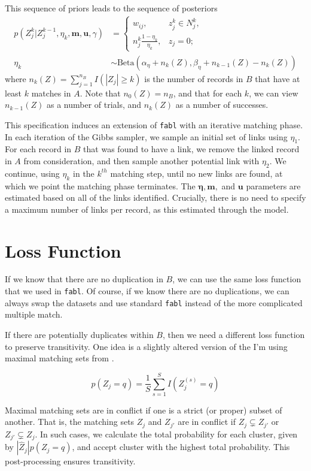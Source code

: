 \documentclass[12pt,letterpaper]{article}
\newcommand{\1}[1]{\mathbb{I}\!\left[#1\right]} %
\begin{document}
This sequence of priors leads to the sequence of posteriors
\begin{align}
	p(Z_j^k|Z_j^{k-1}, \eta_k, \bm{m}, \bm{u}, \gamma) &= \begin{cases}
		w_{ij}, & z_j^k \in N_j^k, \\
		n_j^k \frac{1 - \eta_k}{\eta_k}, & z_j = 0;
	\end{cases} \\
	\eta_k &\sim \text{Beta}(\alpha_{\eta} + n_k(Z), \beta_{\eta} + n_{k-1}(Z) - n_k(Z))
\end{align}
where $n_k(Z) = \sum_{j=1}^{n_B} I( |Z_j| \geq k)$ is the number of records in $B$ that have at least $k$ matches in $A$. Note that $n_0(Z) = n_B$, and that for each $k$, we can view $n_{k-1}{(Z)}$ as a number of trials, and $n_{k}{(Z)}$ as a number of successes. 

This specification induces an extension of \texttt{fabl} with an iterative matching phase. In each iteration of the Gibbs sampler, we sample an initial set of links using $\eta_1$. For each record in $B$ that was found to have a link, we remove the linked record in $A$ from consideration, and then sample another potential link with $\eta_2$. We continue, using $\eta_k$ in the $k^{th}$ matching step, until no new links are found, at which we point the matching phase terminates. The $\bm{\eta}, \bm{m},$ and $\bm{u}$ parameters are estimated based on all of the links identified. Crucially, there is no need to specify a maximum number of links per record, as this estimated through the model.

\section{Loss Function}

If we know that there are no duplication in $B$, we can use the same loss function that we used in \texttt{fabl}. Of course, if we know there are no duplications, we can always swap the datasets and use standard \texttt{fabl} instead of the more complicated multiple match. 

If there are potentially duplicates within $B$, then we need a different loss function to preserve transitivity. One idea is a slightly altered version of the I'm using maximal matching sets from \cite{steorts_bayesian_2016}.

$$p(Z_j = q) =  \frac{1}{S}\sum_{s = 1}^S I\left(Z_j^{(s)} = q\right)$$

Maximal matching sets are in conflict if one is a strict (or proper) subset of another. That is, the matching sets $Z_j$ and $Z_{j'}$ are in conflict if $Z_j \subsetneq Z_{j'}$ or $Z_{j'} \subsetneq Z_j$. In such cases, we calculate the total probability for each cluster, given by $|\hat{Z}_j| p(Z_j = q)$, and accept cluster with the highest total probability. This post-processing ensures transitivity. 
\end{document}

